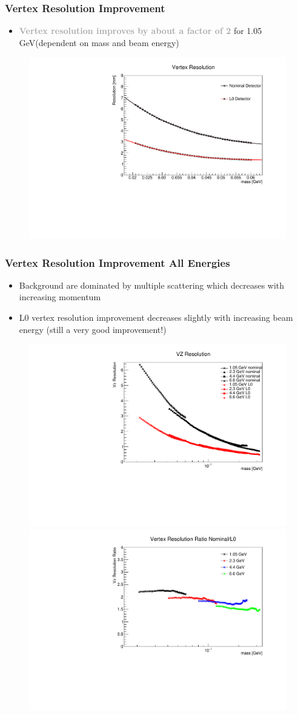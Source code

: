 \documentclass{beamer}
\begin{document}
\begin{frame}
\frametitle{Vertex Resolution Improvement}
\begin{itemize}
\item \textcolor{darkgray}{\textbf{Vertex resolution improves by about a factor of 2}} for 1.05 GeV(dependent on mass and beam energy)
\end{itemize}
\begin{figure}
\includegraphics[width=0.6\linewidth]{figs/VZ_Resolution_1pt05.pdf}
\end{figure}

\end{frame}


\begin{frame}
\frametitle{Vertex Resolution Improvement All Energies}
\begin{itemize}
\item Background are dominated by multiple scattering which decreases with increasing momentum
\item L0 vertex resolution improvement decreases slightly with increasing beam energy (still a very good improvement!)
\end{itemize}
\begin{figure}
\includegraphics[width=0.55\linewidth]{figs/VZ_Resolution_total.pdf}
\includegraphics[width=0.55\linewidth]{figs/VZ_Resolution_ratio.pdf}
\end{figure}

\end{frame}
\end{document}

